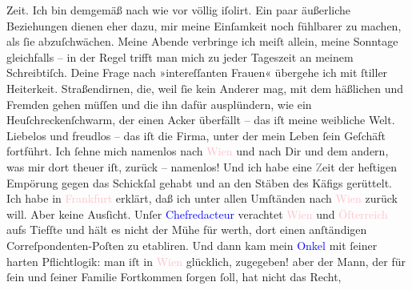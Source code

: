                Zeit. Ich bin demgemäß nach wie vor völlig iſolirt. Ein paar äußerliche Beziehungen
               dienen eher dazu, mir meine Einſamkeit noch fühlbarer zu machen, als ſie
               abzuſchwächen. Meine Abende verbringe ich meiſt allein, meine Sonntage gleichfalls –
               in der Regel trifft man mich zu jeder Tageszeit an meinem Schreibtiſch. Deine Frage
               nach »intereſſanten Frauen« übergehe ich mit ſtiller Heiterkeit. Straßendirnen, die,
               weil ſie kein Anderer mag, mit dem häßlichen und \label{K_L02668-13v}\label{K_L02668-13h} Fremden gehen müſſen und die ihn dafür ausplündern, wie ein
               Heuſchreckenſchwarm, der einen Acker überfällt – das iſt meine {\pb}weibliche Welt. Liebelos und freudlos – das iſt die
               Firma, unter der mein Leben ſein Geſchäft fortführt. Ich ſehne mich namenlos nach \textcolor{pink}{Wien}{}\ledrightnote{\textcolor{pink}{Wien}} und nach Dir und dem andern, was mir dort
               theuer iſt, zurück – namenlos! Und ich habe eine \textcolor{gray}{Z}eit der heftigen
               Empörung gegen das Schickſal gehabt und an den Stäben des Käfigs gerüttelt. Ich habe
               in \textcolor{pink}{Frankfurt}{}\ledrightnote{\textcolor{pink}{Frankfurt am Main}} erklärt, daß ich unter allen
               Umſtänden nach \textcolor{pink}{Wien}{}\ledrightnote{\textcolor{pink}{Wien}} zurück will. Aber keine
               Ausſicht. Unſer \textcolor{blue}{Chefredacteur}{} verachtet \textcolor{pink}{Wien}{}\ledrightnote{\textcolor{pink}{Wien}} und \textcolor{pink}{Öſterreich}{}\ledrightnote{\textcolor{pink}{Österreich}} aufs Tiefſte und hält es nicht der
               Mühe für werth, dort einen anſtändigen Correſpondenten-Poſten zu etabliren. Und dann
               kam mein \textcolor{blue}{Onkel}{}\ledrightnote{\textcolor{blue}{Fedor Mamroth}} mit ſeiner harten Pflichtlogik:
               man iſt in \textcolor{pink}{Wien}{}\ledrightnote{\textcolor{pink}{Wien}} glücklich, zugegeben! aber der
               Mann, der für ſein und ſeiner Familie Fortkommen ſorgen ſoll, hat nicht das Recht,
